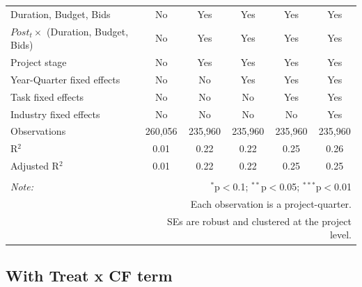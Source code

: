 \documentclass[
]{article}
\begin{document}
\begin{table}[H]
\begin{tabular}{@{\extracolsep{-2pt}}lccccc}
Duration, Budget, Bids & No & Yes & Yes & Yes & Yes \\ 
$Post_t \times $  (Duration, Budget, Bids) & No & Yes & Yes & Yes & Yes \\ 
Project stage & No & Yes & Yes & Yes & Yes \\ 
Year-Quarter fixed effects & No & No & Yes & Yes & Yes \\ 
Task fixed effects & No & No & No & Yes & Yes \\ 
Industry fixed effects & No & No & No & No & Yes \\ 
Observations & 260,056 & 235,960 & 235,960 & 235,960 & 235,960 \\ 
R$^{2}$ & 0.01 & 0.22 & 0.22 & 0.25 & 0.26 \\ 
Adjusted R$^{2}$ & 0.01 & 0.22 & 0.22 & 0.25 & 0.25 \\ 
\hline 
\hline \\[-1.8ex] 
\textit{Note:}  & \multicolumn{5}{r}{$^{*}$p$<$0.1; $^{**}$p$<$0.05; $^{***}$p$<$0.01} \\ 
 & \multicolumn{5}{r}{Each observation is a project-quarter.} \\ 
 & \multicolumn{5}{r}{SEs are robust and clustered at the project level.} \\ 
\end{tabular} 
\end{table}

\hypertarget{with-treat-x-cf-term}{%
\subsection{With Treat x CF term}\label{with-treat-x-cf-term}}
\end{document}
